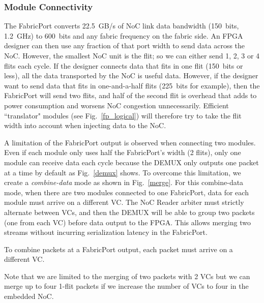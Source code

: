 %
\subsubsection{Module Connectivity}
%

The FabricPort converts 22.5~GB/s of NoC link data bandwidth (150~bits, 1.2~GHz) to 600~bits and any fabric frequency on the fabric side.
An FPGA designer can then use any fraction of that port width to send data across the NoC.
However, the smallest NoC unit is the flit; so we can either send 1, 2, 3 or 4 flits each cycle.
If the designer connects data that fits in one flit (150~bits or less), all the data transported by the NoC is useful data.
However, if the designer want to send data that fits in one-and-a-half flits (225~bits for example), then the FabricPort will send two flits, and half of the second flit is overhead that adds to power consumption and worsens NoC congestion unnecessarily.
Efficient ``translator" modules (see Fig.~\ref{fp_logical}) will therefore try to take the flit width into account when injecting data to the NoC.



A limitation of the FabricPort output is observed when connecting two modules.
Even if each module only uses half the FabricPort's width (2 flits), only one module can receive data each cycle because the DEMUX only outputs one packet at a time by default as Fig.~\ref{demux} shows.
To overcome this limitation, we create a \textit{combine-data} mode as shown in Fig.~\ref{merge}.
For this combine-data mode, when there are two modules connected to one FabricPort, data for each module must arrive on a different VC.
The NoC Reader arbiter must strictly alternate between VCs, and then the DEMUX will be able to group two packets (one from each VC) before data output to the FPGA.
This allows merging two streams without incurring serialization latency in the FabricPort.
%
\begin{cond}
To combine packets at a FabricPort output, each packet must arrive on a different VC.
\end{cond}
%
Note that we are limited to the merging of two packets with 2 VCs but we can merge up to four 1-flit packets if we increase the number of VCs to four in the embedded NoC.

